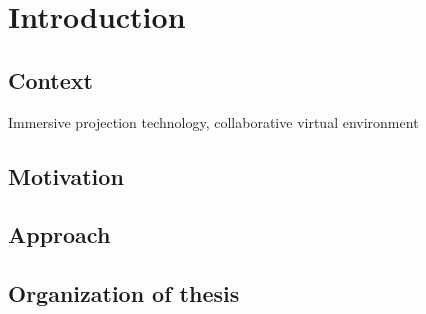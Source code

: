 \chapter*{Introduction}

\section*{Context}

Immersive projection technology, collaborative virtual environment

\section*{Motivation}

\section*{Approach}

\section*{Organization of thesis}